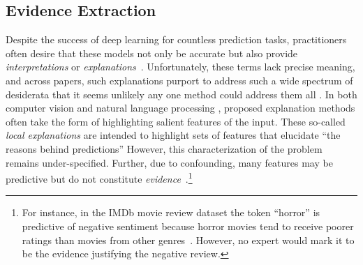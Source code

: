\documentclass{article}
\begin{document}

\subsection{Evidence Extraction} \label{evidence}

Despite the success of deep learning for countless prediction tasks,
practitioners often desire 
that these models not only be accurate
but also provide \emph{interpretations} or \emph{explanations}~\cite{caruana2015intelligible, weld2019challenge}.
Unfortunately, these terms lack precise meaning,
and across papers, such explanations purport
to address such a wide spectrum of desiderata
that it seems unlikely any one method 
could address them all \citep{lipton2018mythos}.
In both computer vision \citep{ribeiro2016should, simonyan2013deep} 
and natural language processing \citep{lei2016rationalizing,lehman2019inferring}, 
proposed explanation methods often take the form of 
highlighting salient features of the input.
These so-called \emph{local explanations} are intended 
to highlight sets of features that elucidate 
``the reasons behind predictions'' %
However, this characterization of the problem remains under-specified.
Further, due to confounding, many features may be 
predictive but do not constitute \textit{evidence}~\cite{kaushik2019learning}.\footnote{For instance, in the IMDb movie review dataset 
the token ``horror'' is predictive of negative sentiment 
because horror movies tend to receive poorer ratings 
than movies from other genres~\cite{kaushik2019learning}.
However, no expert would mark it to be the evidence justifying the negative review.}
\end{document}
